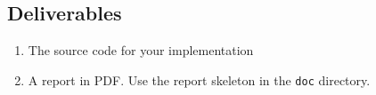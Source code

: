 \documentclass{tufte-handout}
\begin{document}
\subsection{Deliverables}

\begin{enumerate}
  \item The source code for your implementation
  \item A report in PDF.
  Use the report skeleton in the {\tt doc} directory.
  \end{enumerate}
\end{document}
